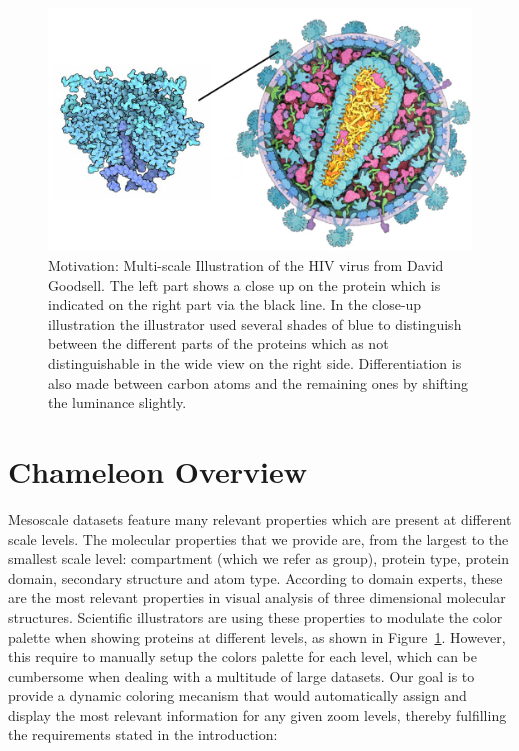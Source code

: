 \documentclass[review,journal]{vgtc}         %
\begin{document}
\begin{figure}
\centering
\includegraphics[width=1\linewidth]{Figures/motivation}
\caption{Motivation: Multi-scale Illustration of the HIV virus from David Goodsell. 
The left part shows a close up on the protein which is indicated on the right part via the black line.
In the close-up illustration the illustrator used several shades of blue to distinguish between the different parts of the proteins which as not distinguishable in the wide view on the right side.
Differentiation is also made between carbon atoms and the remaining ones by shifting the luminance slightly.}
\label{fig:motivation}
\end{figure}	

		
	\section{Chameleon Overview}
	\label{Overview}
	
	Mesoscale datasets feature many relevant properties which are present at different scale levels.
	The molecular properties that we provide are, from the largest to the smallest scale level: compartment (which we refer as group), protein type, protein domain, secondary structure and atom type.
	According to domain experts, these are the most relevant properties in visual analysis of three dimensional molecular structures.
	Scientific illustrators are using these properties to modulate the color palette when showing proteins at different levels, as shown in Figure~\ref{fig:motivation}.
	However, this require to manually setup the colors palette for each level, which can be cumbersome when dealing with a multitude of large datasets.
	Our goal is to provide a dynamic coloring mecanism that would automatically assign and display the most relevant information for any given zoom levels, thereby fulfilling the requirements stated in the introduction: 
		
\end{document}
